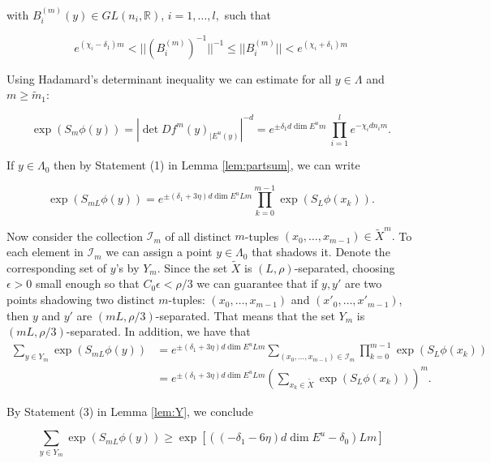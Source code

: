 \documentclass{amsart}
\theoremstyle{plain}
\theoremstyle{definition}
\theoremstyle{remark}
\numberwithin{equation}{section}
\begin{document}
with $B^{(m)}_i(y)\in GL(n_i, \mathbb{R})$, $i=1, \ldots ,l,$ such that


$$  e^{(\chi_i-\delta_1)m} < ||(B^{(m)}_i)^{-1}||^{-1} \leq ||B^{(m)}_i|| < e^{(\chi_i+\delta_1)m} $$ 













Using  Hadamard's determinant inequality we can estimate for all $y\in \Lambda$ and $m\geq \tilde{m}_1$:

\begin{equation}\label{eqn:had}
   \exp( S_{m} \phi (y)) =     |\det Df^m(y)_{| E^u(y)}|^{-d}   =e^{\pm \delta_1 d \dim E^u m } ~ \prod_{i=1}^l e^{-\chi_i d n_i m } .  
\end{equation}

If $y\in \Lambda_0$ then by Statement (1) in Lemma \ref{lem:partsum}, we can write 

$$  \exp (S_{mL} \phi (y)) = e^{\pm (\delta_1 + 3 \eta) d \dim E^u Lm}  \prod_{k=0}^{m-1}  \exp( S_L \phi (x_k) ) .    $$

Now consider the collection $\mathcal{I}_m$ of all distinct $m$-tuples $(x_0, \ldots, x_{m-1})\in \tilde{X}^{m}.$
To each element in $\mathcal{I}_m$ we can assign a point $y\in \Lambda_0$ that shadows it. Denote the corresponding set of $y$'s by $Y_m$.
 Since the set $\tilde{X}$ is $(L, \rho)$-separated, choosing $\epsilon>0$ small enough so that $C_0\epsilon< \rho/3$ we can guarantee that if
$y,y'$ are two points shadowing two distinct  $m$-tuples: $(x_0, \ldots, x_{m-1})$ and $(x'_0, \ldots, x'_{m-1})$, then $y$ and $y'$ are $(mL, \rho/3)$-separated. That means that the set $Y_m$ is $(mL, \rho/3)$-separated.
In addition, we have that
\begin{align*}
\sum_{y\in Y_m}   \exp( S_{mL} \phi (y)) &=   e^{\pm (\delta_1 + 3 \eta) d \dim E^u Lm}  \sum_{ (x_0, \ldots, x_{m-1}) \in \mathcal{I}_m   }  \prod_{k=0}^{m-1}  \exp( S_L \phi (x_k)) \\
& =       e^{\pm (\delta_1 + 3 \eta) d \dim E^u Lm}      \left(  \sum_{x_k \in \tilde{X}}    \exp( S_L \phi (x_k)) \right)^m    .  
\end{align*}



By Statement (3) in Lemma \ref{lem:Y}, we conclude

$$     \sum_{y\in Y_m}   \exp (S_{mL} \phi (y) )   \geq   \exp \left[        ( (-\delta_1 - 6\eta) d \dim E^u - \delta_0) Lm      \right]$$
 
\end{document}

